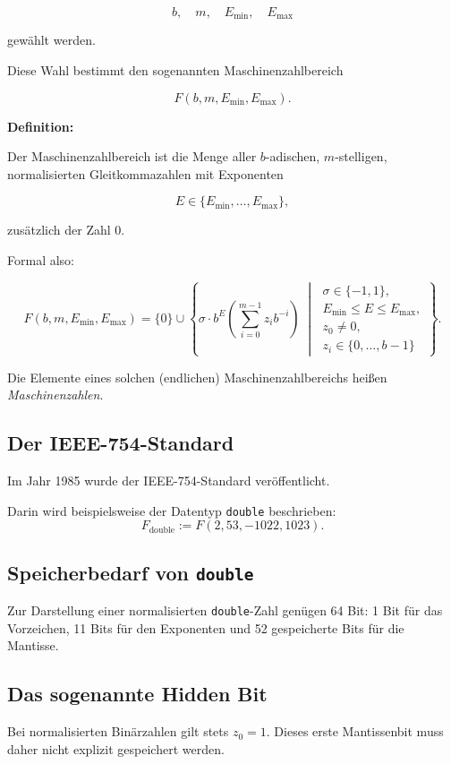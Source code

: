 \documentclass{article}
\begin{document}
\[
b,\quad m,\quad E_{\min},\quad E_{\max}
\]

gewählt werden.


Diese Wahl bestimmt den sogenannten Maschinenzahlbereich

\[
F(b,m,E_{\min},E_{\max}).
\]

\textbf{Definition:}

Der Maschinenzahlbereich ist die Menge aller \(b\)-adischen, \(m\)-stelligen, normalisierten Gleitkommazahlen mit Exponenten

\[
E\in\{E_{\min},\dots,E_{\max}\},
\]

zusätzlich der Zahl \(0\).

Formal also:

\[
F(b,m,E_{\min},E_{\max})
=
\{0\}\cup
\left\{
\sigma\cdot b^E
\left(\sum_{i=0}^{m-1} z_i b^{-i}\right)
\;\middle|\;
\begin{array}{l}
\sigma\in\{-1,1\},\\
E_{\min}\leq E\leq E_{\max},\\
z_0\neq 0,\\
z_i\in\{0,\dots,b-1\}
\end{array}
\right\}.
\]

Die Elemente eines solchen (endlichen) Maschinenzahlbereichs heißen \emph{Maschinenzahlen}.


\subsection*{Der IEEE-754-Standard}

Im Jahr 1985 wurde der IEEE-754-Standard veröffentlicht.  


Darin wird beispielsweise der Datentyp \texttt{double} beschrieben:
\[
F_{\text{double}}:=F(2,53,-1022,1023).
\]

\subsection*{Speicherbedarf von \texttt{double}}

Zur Darstellung einer normalisierten \texttt{double}-Zahl genügen 64 Bit: 1 Bit für das Vorzeichen, 11 Bits für den Exponenten und 52 gespeicherte Bits für die Mantisse.

\subsection*{Das sogenannte Hidden Bit}

Bei normalisierten Binärzahlen gilt stets \(z_0=1\). Dieses erste Mantissenbit muss daher nicht explizit gespeichert werden.
\end{document}

